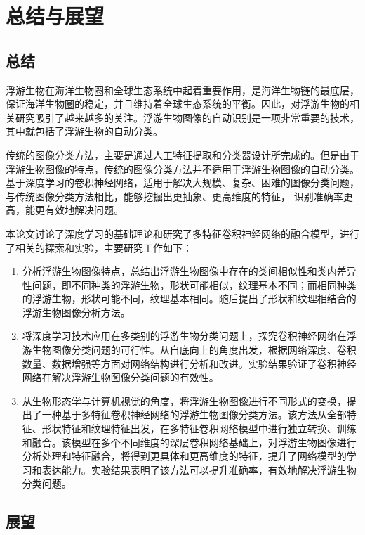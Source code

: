 \chapter{总结与展望}

\section{总结}

浮游生物在海洋生物圈和全球生态系统中起着重要作用，是海洋生物链的最底层，保证海洋生物圈的稳定，并且维持着全球生态系统的平衡。因此，对浮游生物的相关研究吸引了越来越多的关注。浮游生物图像的自动识别是一项非常重要的技术，其中就包括了浮游生物的自动分类。

传统的图像分类方法，主要是通过人工特征提取和分类器设计所完成的。但是由于浮游生物图像的特点，传统的图像分类方法并不适用于浮游生物图像的自动分类。基于深度学习的卷积神经网络，适用于解决大规模、复杂、困难的图像分类问题，与传统图像分类方法相比，能够挖掘出更抽象、更高维度的特征，
识别准确率更高，能更有效地解决问题。


本论文讨论了深度学习的基础理论和研究了多特征卷积神经网络的融合模型，进行了相关的探索和实验，主要研究工作如下：

\begin{enumerate}
\item 分析浮游生物图像特点，总结出浮游生物图像中存在的类间相似性和类内差异性问题，即不同种类的浮游生物，形状可能相似，纹理基本不同；而相同种类的浮游生物，形状可能不同，纹理基本相同。随后提出了形状和纹理相结合的浮游生物图像分析方法。
\item 将深度学习技术应用在多类别的浮游生物分类问题上，探究卷积神经网络在浮游生物图像分类问题的可行性。从自底向上的角度出发，根据网络深度、卷积数量、数据增强等方面对网络结构进行分析和改进。实验结果验证了卷积神经网络在解决浮游生物图像分类问题的有效性。
\item 从生物形态学与计算机视觉的角度，将浮游生物图像进行不同形式的变换，提出了一种基于多特征卷积神经网络的浮游生物图像分类方法。该方法从全部特征、形状特征和纹理特征出发，在多特征卷积网络模型中进行独立转换、训练和融合。该模型在多个不同维度的深层卷积网络基础上，对浮游生物图像进行分析处理和特征融合，将得到更具体和更高维度的特征，提升了网络模型的学习和表达能力。实验结果表明了该方法可以提升准确率，有效地解决浮游生物分类问题。
\end{enumerate}


\section{展望}

